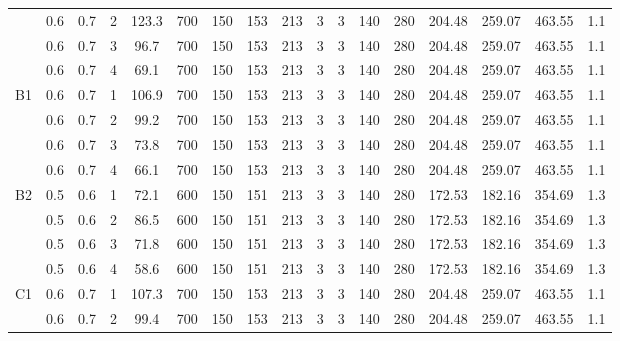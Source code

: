 \begin{table}[H]
{\begin{tabular}{|c|c|c|r|c|c|c|c|c|c|c|c|c|c|c|c|c|}
\cline{2-17}          & 0.6   & 0.7   & 2     & 123.3 & 700   & 150   & 153   & 213   & 3     & 3     & 140   & 280   & 204.48 & 259.07 & 463.55 & 1.1 \bigstrut\\
\cline{2-17}          & 0.6   & 0.7   & 3     & 96.7  & 700   & 150   & 153   & 213   & 3     & 3     & 140   & 280   & 204.48 & 259.07 & 463.55 & 1.1 \bigstrut\\
\cline{2-17}          & 0.6   & 0.7   & 4     & 69.1  & 700   & 150   & 153   & 213   & 3     & 3     & 140   & 280   & 204.48 & 259.07 & 463.55 & 1.1 \bigstrut\\
    \hline
    \multirow{4}[8]{*}{B1} & 0.6   & 0.7   & 1     & 106.9 & 700   & 150   & 153   & 213   & 3     & 3     & 140   & 280   & 204.48 & 259.07 & 463.55 & 1.1 \bigstrut\\
\cline{2-17}          & 0.6   & 0.7   & 2     & 99.2  & 700   & 150   & 153   & 213   & 3     & 3     & 140   & 280   & 204.48 & 259.07 & 463.55 & 1.1 \bigstrut\\
\cline{2-17}          & 0.6   & 0.7   & 3     & 73.8  & 700   & 150   & 153   & 213   & 3     & 3     & 140   & 280   & 204.48 & 259.07 & 463.55 & 1.1 \bigstrut\\
\cline{2-17}          & 0.6   & 0.7   & 4     & 66.1  & 700   & 150   & 153   & 213   & 3     & 3     & 140   & 280   & 204.48 & 259.07 & 463.55 & 1.1 \bigstrut\\
    \hline
    \multirow{4}[8]{*}{B2} & 0.5   & 0.6   & 1     & 72.1  & 600   & 150   & 151   & 213   & 3     & 3     & 140   & 280   & 172.53 & 182.16 & 354.69 & 1.3 \bigstrut\\
\cline{2-17}          & 0.5   & 0.6   & 2     & 86.5  & 600   & 150   & 151   & 213   & 3     & 3     & 140   & 280   & 172.53 & 182.16 & 354.69 & 1.3 \bigstrut\\
\cline{2-17}          & 0.5   & 0.6   & 3     & 71.8  & 600   & 150   & 151   & 213   & 3     & 3     & 140   & 280   & 172.53 & 182.16 & 354.69 & 1.3 \bigstrut\\
\cline{2-17}          & 0.5   & 0.6   & 4     & 58.6  & 600   & 150   & 151   & 213   & 3     & 3     & 140   & 280   & 172.53 & 182.16 & 354.69 & 1.3 \bigstrut\\
    \hline
    \multirow{4}[8]{*}{C1} & 0.6   & 0.7   & 1     & 107.3 & 700   & 150   & 153   & 213   & 3     & 3     & 140   & 280   & 204.48 & 259.07 & 463.55 & 1.1 \bigstrut\\
\cline{2-17}          & 0.6   & 0.7   & 2     & 99.4  & 700   & 150   & 153   & 213   & 3     & 3     & 140   & 280   & 204.48 & 259.07 & 463.55 & 1.1 \bigstrut\\

\end{tabular}}
\end{table}
